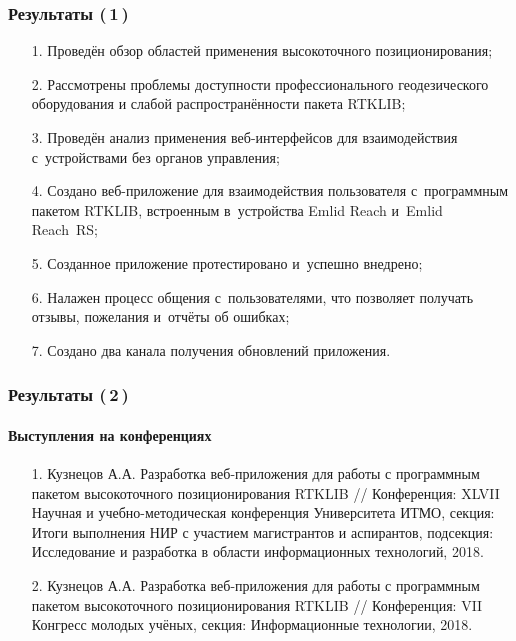 \documentclass[xetex,с,aspectratio=169]{beamer}
\begin{document}
%
%
\begin{frame}
  \frametitle{Результаты (\,1\,)}

  \large

  \begin{itemize}
    \setlength\itemsep{0.5em}
    \item[1.] Проведён обзор областей применения высокоточного позиционирования;
    \item[2.] Рассмотрены проблемы доступности профессионального геодезического оборудования и слабой распространённости пакета RTKLIB;
    \item[3.] Проведён анализ применения веб-интерфейсов для взаимодействия с~устройствами без органов управления;
    \item[4.] Создано веб-приложение для взаимодействия пользователя с~программным пакетом RTKLIB, встроенным в~устройства Emlid Reach и~Emlid Reach~RS;
    \item[5.] Созданное приложение протестировано и~успешно внедрено;
    \item[6.] Налажен процесс общения с~пользователями, что позволяет получать отзывы, пожелания и~отчёты об ошибках;
    \item[7.] Создано два канала получения обновлений приложения.
  \end{itemize}
\end{frame}


%
%
\begin{frame}
  \frametitle{Результаты (\,2\,)}
  \framesubtitle{Выступления на конференциях}
  
  \large
  
  \begin{itemize}
    \setlength\itemsep{1em}
    \item[1.] Кузнецов А.А. Разработка веб-приложения для работы с программным пакетом высокоточного позиционирования RTKLIB // Конференция: XLVII Научная и учебно-методическая конференция Университета ИТМО, секция: Итоги выполнения НИР с участием магистрантов и аспирантов, подсекция: Исследование и разработка в области информационных технологий, 2018.
    \item[2.] Кузнецов А.А. Разработка веб-приложения для работы с программным пакетом высокоточного позиционирования RTKLIB // Конференция: VII Конгресс молодых учёных, секция: Информационные технологии, 2018.
  \end{itemize}
\end{frame}


%
%
{

  \begin{frame}[c]
    \begin{center}
      \Huge\bfseries
      \color{ifmoblue}{Спасибо за внимание}
    \end{center}
  \end{frame}
}
\end{document}

